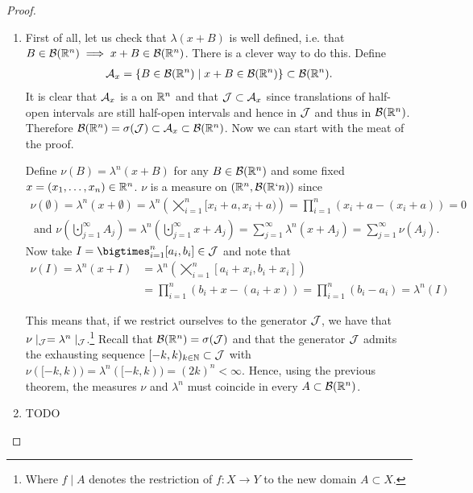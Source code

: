 \begin{proof}$ $\newline
	\begin{enumerate}
		\item First of all, let us check that $\lambda(x + B)$ is well defined, i.e. that $B \in \mathcal{B}(\mathbb{R}^n) \implies x + B \in \mathcal{B}(\mathbb{R}^n)$. There is a clever way to do this. Define
		\begin{align*}
			\mathcal{A}_x = \{B \in \mathcal{B}(\mathbb{R}^n) \mid x + B \in \mathcal{B}(\mathbb{R}^n)\} \subset \mathcal{B}(\mathbb{R}^n).
		\end{align*}
		It is clear that $\mathcal{A}_x$ is a \siga on $\mathbb{R}^n$ and that $\mathcal{J} \subset \mathcal{A}_x$ since translations of half-open intervals are still half-open intervals and hence in $\mathcal{J}$ and thus in $\mathcal{B}(\mathbb{R}^n)$. Therefore $\mathcal{B}(\mathbb{R}^n) = \sigma(\mathcal{J}) \subset \mathcal{A}_x \subset \mathcal{B}(\mathbb{R}^n)$. Now we can start with the meat of the proof.
		
		Define $\nu(B) = \lambda^n(x + B)$ for any $B \in \mathcal{B}(\mathbb{R}^n)$ and some fixed $x =(x_1, \dots, x_n) \in \mathbb{R}^n$. $\nu$ is a measure on $(\mathbb{R}^n, \mathcal{B}(\mathbb{R}`n))$ since
		\begin{align*}
			\nu(\emptyset) = \lambda^n(x + \emptyset) = \lambda^n\left(\bigtimes_{i = 1}^n [x_i + a, x_i + a)\right) = \prod_{i=1}^n (x_i + a - (x_i + a)) = 0\\
			\text{ and }\nu\left(\bigcupdot_{j = 1}^\infty A_j \right) = \lambda^n\left(\bigcupdot_{j = 1}^\infty x + A_j\right) = \sum_{j = 1}^\infty \lambda^n (x + A_j) = \sum_{j = 1}^\infty \nu(A_j).
		\end{align*}
		Now take $I = \bigtimes_{i = 1}^n [a_i, b_i] \in \calJ$ and note that
		\begin{align*}
			\nu(I) = \lambda^n(x + I) &= \lambda^n \left(\bigtimes_{i = 1}^n [a_i + x_i, b_i + x_i]\right) \\
			&= \prod_{i=1}^n (b_i + x - (a_i + x)) = \prod_{i=1}^n (b_i - a_i) = \lambda^n(I)
		\end{align*}
		
		This means that, if we restrict ourselves to the generator $\mathcal{J}$, we have that $\nu\mid_{\mathcal{J}} = \lambda^n\mid_{\mathcal{J}}$.\footnote{Where $f\mid A$ denotes the restriction of $f: X \to Y$ to the new domain $A \subset X$.} Recall that $\mathcal{B}(\mathbb{R}^n) = \sigma(\mathcal{J})$ and that the generator $\mathcal{J}$ admits the exhausting sequence $[-k, k)_{k \in \mathbb{N}} \subset \mathcal{J}$ with $\nu([-k, k)) = \lambda^n([-k, k)) = (2k)^n < \infty$. Hence, using the previous theorem, the measures $\nu$ and $\lambda^n$ must coincide in every $A \subset \mathcal{B}(\mathbb{R}^n)$.
		
		\item TODO
	\end{enumerate}
\end{proof}